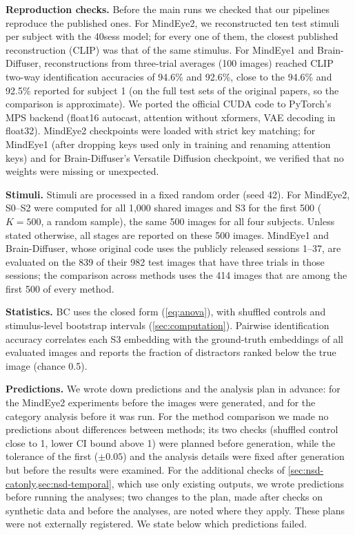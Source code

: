 \documentclass[11pt,a4paper]{article}
\begin{document}
\textbf{Reproduction checks.} Before the main runs we checked that our
pipelines reproduce the published ones. For MindEye2, we reconstructed ten test
stimuli per subject with the 40sess model; for every one of them, the closest
published reconstruction (CLIP) was that of the same stimulus. For MindEye1 and
Brain-Diffuser, reconstructions from three-trial averages (100 images) reached
CLIP two-way identification accuracies of 94.6\% and 92.6\%, close to the
94.6\% and 92.5\% reported for subject 1 (on the full test sets of the original
papers, so the comparison is approximate). We ported the official CUDA code to PyTorch's MPS
backend (float16 autocast, attention without xformers, VAE decoding in float32).
MindEye2 checkpoints were loaded with strict key matching; for MindEye1 (after
dropping keys used only in training and renaming attention keys) and for
Brain-Diffuser's Versatile Diffusion checkpoint, we verified that no weights
were missing or unexpected.

\textbf{Stimuli.} Stimuli are processed in a fixed random order (seed 42). For
MindEye2, S0--S2 were computed for all 1,000 shared images and S3 for the first
500 ($K=500$, a random sample), the same 500 images for all four subjects.
Unless stated otherwise, all stages are reported on these 500 images. MindEye1 and
Brain-Diffuser, whose original code uses the publicly released sessions 1--37,
are evaluated on the 839 of their 982 test images that have three trials in
those sessions; the comparison across methods uses the 414 images that are
among the first 500 of every method.

\textbf{Statistics.} BC uses the closed form (\cref{eq:anova}), with shuffled
controls and stimulus-level bootstrap intervals (\cref{sec:computation}).
Pairwise identification accuracy correlates each S3 embedding with the
ground-truth embeddings of all evaluated images and reports the fraction of
distractors ranked below the true image (chance 0.5).

\textbf{Predictions.} We wrote down predictions and the analysis plan in
advance: for the MindEye2 experiments before the images were generated, and for
the category analysis before it was run. For the method comparison we made no
predictions about differences between methods; its two checks (shuffled control
close to 1, lower CI bound above 1) were planned before generation, while the
tolerance of the first ($\pm0.05$) and the analysis details were fixed after
generation but before the results were examined. For the additional checks of
\cref{sec:nsd-catonly,sec:nsd-temporal}, which use only existing outputs, we
wrote predictions before running the analyses; two changes to the plan, made
after checks on synthetic data and before the analyses, are noted where they
apply. These plans were not externally registered. We state below which
predictions failed.
\end{document}

